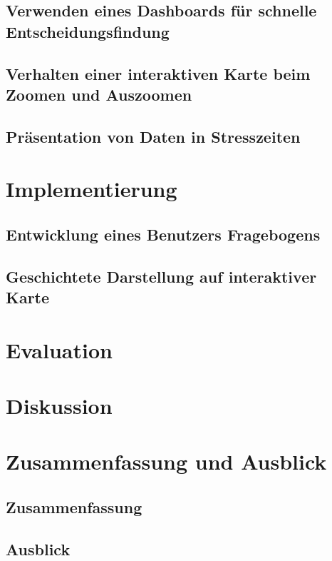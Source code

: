 \section{Verwenden eines Dashboards für schnelle Entscheidungsfindung}
\section{Verhalten einer interaktiven Karte beim Zoomen und Auszoomen}
\section{Präsentation von Daten in Stresszeiten}

\chapter{Implementierung}
\section{Entwicklung eines Benutzers Fragebogens}
\section{Geschichtete Darstellung auf interaktiver Karte}

\chapter{Evaluation}

\chapter{Diskussion}

\chapter{Zusammenfassung und Ausblick}
\section{Zusammenfassung}
\section{Ausblick}
